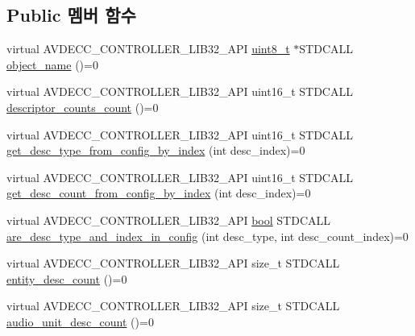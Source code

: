 \subsection*{Public 멤버 함수}
\begin{DoxyCompactItemize}
\item 
virtual A\+V\+D\+E\+C\+C\+\_\+\+C\+O\+N\+T\+R\+O\+L\+L\+E\+R\+\_\+\+L\+I\+B32\+\_\+\+A\+PI \hyperlink{stdint_8h_aba7bc1797add20fe3efdf37ced1182c5}{uint8\+\_\+t} $\ast$S\+T\+D\+C\+A\+LL \hyperlink{classavdecc__lib_1_1configuration__descriptor_a133f7774946d80f82b8aaaa4cfbb7361}{object\+\_\+name} ()=0
\item 
virtual A\+V\+D\+E\+C\+C\+\_\+\+C\+O\+N\+T\+R\+O\+L\+L\+E\+R\+\_\+\+L\+I\+B32\+\_\+\+A\+PI uint16\+\_\+t S\+T\+D\+C\+A\+LL \hyperlink{classavdecc__lib_1_1configuration__descriptor_ac79e004a8615b2ac588c8bdf1694508d}{descriptor\+\_\+counts\+\_\+count} ()=0
\item 
virtual A\+V\+D\+E\+C\+C\+\_\+\+C\+O\+N\+T\+R\+O\+L\+L\+E\+R\+\_\+\+L\+I\+B32\+\_\+\+A\+PI uint16\+\_\+t S\+T\+D\+C\+A\+LL \hyperlink{classavdecc__lib_1_1configuration__descriptor_a2bb7fa704062891fa5dec1af9c3bd584}{get\+\_\+desc\+\_\+type\+\_\+from\+\_\+config\+\_\+by\+\_\+index} (int desc\+\_\+index)=0
\item 
virtual A\+V\+D\+E\+C\+C\+\_\+\+C\+O\+N\+T\+R\+O\+L\+L\+E\+R\+\_\+\+L\+I\+B32\+\_\+\+A\+PI uint16\+\_\+t S\+T\+D\+C\+A\+LL \hyperlink{classavdecc__lib_1_1configuration__descriptor_a08425469ea1f3148c9d5df195225c351}{get\+\_\+desc\+\_\+count\+\_\+from\+\_\+config\+\_\+by\+\_\+index} (int desc\+\_\+index)=0
\item 
virtual A\+V\+D\+E\+C\+C\+\_\+\+C\+O\+N\+T\+R\+O\+L\+L\+E\+R\+\_\+\+L\+I\+B32\+\_\+\+A\+PI \hyperlink{avb__gptp_8h_af6a258d8f3ee5206d682d799316314b1}{bool} S\+T\+D\+C\+A\+LL \hyperlink{classavdecc__lib_1_1configuration__descriptor_a2d7cc1f3cc9cd7c4075bca75f0b3fc1c}{are\+\_\+desc\+\_\+type\+\_\+and\+\_\+index\+\_\+in\+\_\+config} (int desc\+\_\+type, int desc\+\_\+count\+\_\+index)=0
\item 
virtual A\+V\+D\+E\+C\+C\+\_\+\+C\+O\+N\+T\+R\+O\+L\+L\+E\+R\+\_\+\+L\+I\+B32\+\_\+\+A\+PI size\+\_\+t S\+T\+D\+C\+A\+LL \hyperlink{classavdecc__lib_1_1configuration__descriptor_a14c0322d46a8800dbb4908716db50d86}{entity\+\_\+desc\+\_\+count} ()=0
\item 
virtual A\+V\+D\+E\+C\+C\+\_\+\+C\+O\+N\+T\+R\+O\+L\+L\+E\+R\+\_\+\+L\+I\+B32\+\_\+\+A\+PI size\+\_\+t S\+T\+D\+C\+A\+LL \hyperlink{classavdecc__lib_1_1configuration__descriptor_a1b8da825afb3257bca8a6506b9f021c9}{audio\+\_\+unit\+\_\+desc\+\_\+count} ()=0

\end{DoxyCompactItemize}
